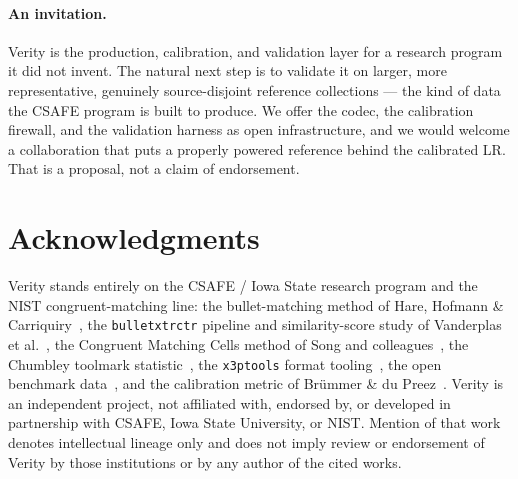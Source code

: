 \documentclass[11pt]{article}
\newcommand{\code}[1]{\texttt{#1}}
\begin{document}
\paragraph{An invitation.} Verity is the production, calibration, and validation
layer for a research program it did not invent. The natural next step is to validate
it on larger, more representative, genuinely source-disjoint reference collections
--- the kind of data the CSAFE program is built to produce. We offer the codec, the
calibration firewall, and the validation harness as open infrastructure, and we
would welcome a collaboration that puts a properly powered reference behind the
calibrated LR. That is a proposal, not a claim of endorsement.

\section*{Acknowledgments}
Verity stands entirely on the CSAFE / Iowa State research program and the NIST
congruent-matching line: the bullet-matching method of Hare, Hofmann \&
Carriquiry~\cite{hare2017}, the \code{bulletxtrctr} pipeline and similarity-score
study of Vanderplas et al.~\cite{vanderplas2020}, the Congruent Matching Cells
method of Song and colleagues~\cite{song2013,song2018}, the Chumbley
toolmark statistic~\cite{chumbley2010}, the \code{x3ptools} format
tooling~\cite{x3ptools2024}, the open benchmark data~\cite{hamby2009,fadul2011,nbtrd2020},
and the calibration metric of Br\"ummer \& du Preez~\cite{brummer2006}. Verity is
an independent project, not affiliated with, endorsed by, or developed in
partnership with CSAFE, Iowa State University, or NIST. Mention of that work
denotes intellectual lineage only and does not imply review or endorsement of
Verity by those institutions or by any author of the cited works.
\end{document}
